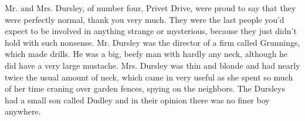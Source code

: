 \vspace{4cm}

Mr. and Mrs. Dursley, of number four, Privet Drive, were proud to say that they were perfectly normal, thank you very much. They were the last people you'd expect to be involved in anything strange or mysterious, because they just didn't hold with such nonsense. 
Mr. Dursley was the director of a firm called Grunnings, which made 
drills. He was a big, beefy man with hardly any neck, although he did 
have a very large mustache. Mrs. Dursley was thin and blonde and had 
nearly twice the usual amount of neck, which came in very useful as she 
spent so much of her time craning over garden fences, spying on the 
neighbors. The Dursleys had a small son called Dudley and in their 
opinion there was no finer boy anywhere. 
